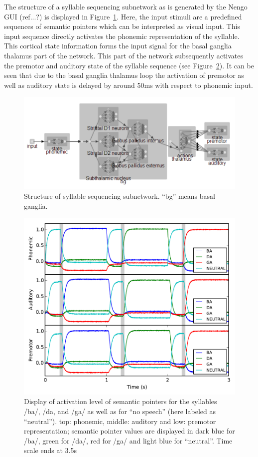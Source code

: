 \documentclass[conference]{IEEEtran}
\begin{document}
The structure of a syllable sequencing subnetwork as
is generated by the Nengo GUI (ref...?) is displayed in
Figure~\ref{fig:ipynb551_structure}.
Here, the input stimuli are a predefined sequences of semantic pointers
which can be interpreted as visual input. This input sequence
directly activates the phonemic representation of the syllable.
This cortical state information forms the input signal for the
basal ganglia thalamus part of the network. This part of the
network subsequently activates the premotor and auditory state
of the syllable sequence (see Figure~\ref{fig:ipynb551_output}).
It can be seen that due to the basal ganglia thalamus loop the
activation of premotor as well as auditory state is delayed by
around 50ms with respect to phonemic input.

\begin{figure}
\centering
\includegraphics[width=\columnwidth]{ipynb551_structure}
\caption{Structure of syllable sequencing subnetwork. ``bg'' means
	basal ganglia.}
\label{fig:ipynb551_structure}
\end{figure}

\begin{figure}
\centering
\includegraphics[width=\columnwidth]{ipynb551_output}
\caption{Display of activation level of semantic pointers for
	the syllables /ba/, /da, and /ga/ as well as for ``no speech''
	(here labeled as ``neutral''). top: phonemic, middle: auditory and
	low: premotor representation; semantic pointer values are displayed in
	dark blue for /ba/, green for /da/, red for /ga/ and light blue for
	``neutral''. Time scale ends at 3.5s}
\label{fig:ipynb551_output}
\end{figure}
\end{document}
